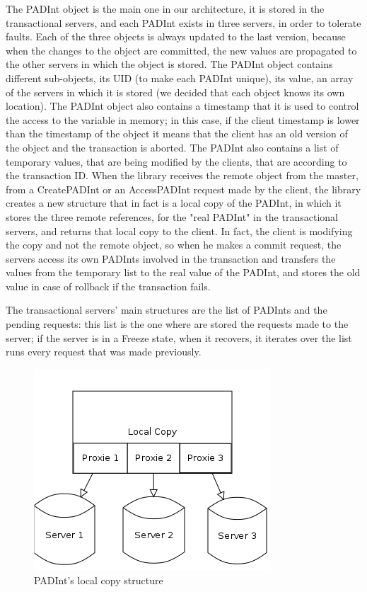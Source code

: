\documentclass[times, 10pt,twocolumn]{article}
\begin{document}
The PADInt object is the main one in our architecture, it is stored in the transactional servers, and each PADInt exists in three servers, in order to tolerate faults. Each of the three objects is always updated to the last version, because when the changes to the object are committed, the new values are propagated to the other servers in which the object is stored. The PADInt object contains different sub-objects, its UID (to make each PADInt unique), its value, an array of the servers in which it is stored (we decided that each object knows its own location). The PADInt object also contains a timestamp that it is used to control the access to the variable in memory; in this case, if the client timestamp is lower than the timestamp of the object it means that the client has an old version of the object and the transaction is aborted. The PADInt also contains a list of temporary values, that are being modified by the clients, that are according to the transaction ID. When the library receives the remote object from the master, from a CreatePADInt or an AccessPADInt request made by the client, the library creates a new structure that in fact is a local copy of the PADInt, in which it stores the three remote references, for the "real PADInt" in the transactional servers, and returns that local copy to the client. In fact, the client is modifying the copy and not the remote object, so when he makes a commit request, the servers access its own PADInts involved in the transaction and transfers the values from the temporary list to the real value of the PADInt, and stores the old value in case of rollback if the transaction fails.

The transactional servers' main structures are the list of PADInts and the pending requests: this list is the one where are stored the requests made to the server; if the server is in a Freeze state, when it recovers, it iterates over the list runs every request that was made previously.

\begin{figure}[h!]

\centering

\includegraphics[scale=0.4]{Padint.png}

\caption{PADInt's local copy structure}

\end{figure}
\end{document}
